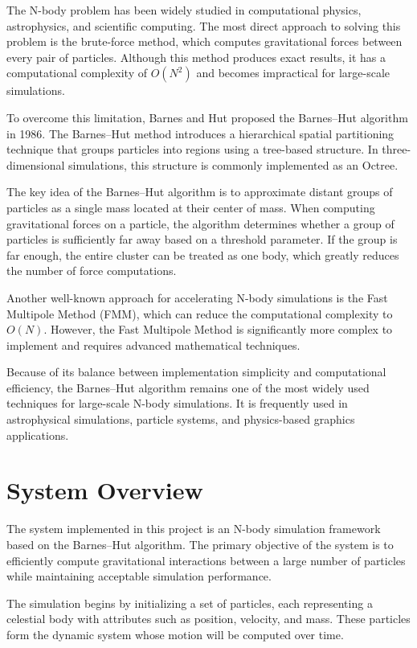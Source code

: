 The N-body problem has been widely studied in computational physics, astrophysics, and scientific computing. The most direct approach to solving this problem is the brute-force method, which computes gravitational forces between every pair of particles. Although this method produces exact results, it has a computational complexity of $O(N^2)$ and becomes impractical for large-scale simulations.

To overcome this limitation, Barnes and Hut proposed the Barnes--Hut algorithm in 1986. The Barnes--Hut method introduces a hierarchical spatial partitioning technique that groups particles into regions using a tree-based structure. In three-dimensional simulations, this structure is commonly implemented as an Octree.

The key idea of the Barnes--Hut algorithm is to approximate distant groups of particles as a single mass located at their center of mass. When computing gravitational forces on a particle, the algorithm determines whether a group of particles is sufficiently far away based on a threshold parameter. If the group is far enough, the entire cluster can be treated as one body, which greatly reduces the number of force computations.

Another well-known approach for accelerating N-body simulations is the Fast Multipole Method (FMM), which can reduce the computational complexity to $O(N)$. However, the Fast Multipole Method is significantly more complex to implement and requires advanced mathematical techniques.

Because of its balance between implementation simplicity and computational efficiency, the Barnes--Hut algorithm remains one of the most widely used techniques for large-scale N-body simulations. It is frequently used in astrophysical simulations, particle systems, and physics-based graphics applications.
\section{System Overview}

The system implemented in this project is an N-body simulation framework based on the Barnes--Hut algorithm. The primary objective of the system is to efficiently compute gravitational interactions between a large number of particles while maintaining acceptable simulation performance.

The simulation begins by initializing a set of particles, each representing a celestial body with attributes such as position, velocity, and mass. These particles form the dynamic system whose motion will be computed over time.

